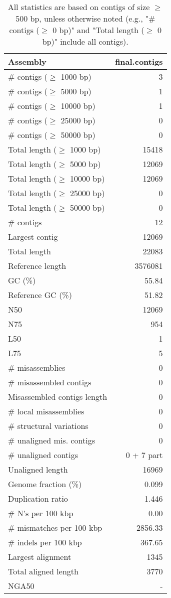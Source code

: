 \documentclass[12pt,a4paper]{article}
\begin{document}
\begin{table}[ht]
\begin{center}
\caption{All statistics are based on contigs of size $\geq$ 500 bp, unless otherwise noted (e.g., "\# contigs ($\geq$ 0 bp)" and "Total length ($\geq$ 0 bp)" include all contigs).}
\begin{tabular}{|l*{1}{|r}|}
\hline
Assembly & final.contigs \\ \hline
\# contigs ($\geq$ 1000 bp) & 3 \\ \hline
\# contigs ($\geq$ 5000 bp) & 1 \\ \hline
\# contigs ($\geq$ 10000 bp) & 1 \\ \hline
\# contigs ($\geq$ 25000 bp) & 0 \\ \hline
\# contigs ($\geq$ 50000 bp) & 0 \\ \hline
Total length ($\geq$ 1000 bp) & 15418 \\ \hline
Total length ($\geq$ 5000 bp) & 12069 \\ \hline
Total length ($\geq$ 10000 bp) & 12069 \\ \hline
Total length ($\geq$ 25000 bp) & 0 \\ \hline
Total length ($\geq$ 50000 bp) & 0 \\ \hline
\# contigs & 12 \\ \hline
Largest contig & 12069 \\ \hline
Total length & 22083 \\ \hline
Reference length & 3576081 \\ \hline
GC (\%) & 55.84 \\ \hline
Reference GC (\%) & 51.82 \\ \hline
N50 & 12069 \\ \hline
N75 & 954 \\ \hline
L50 & 1 \\ \hline
L75 & 5 \\ \hline
\# misassemblies & 0 \\ \hline
\# misassembled contigs & 0 \\ \hline
Misassembled contigs length & 0 \\ \hline
\# local misassemblies & 0 \\ \hline
\# structural variations & 0 \\ \hline
\# unaligned mis. contigs & 0 \\ \hline
\# unaligned contigs & 0 + 7 part \\ \hline
Unaligned length & 16969 \\ \hline
Genome fraction (\%) & 0.099 \\ \hline
Duplication ratio & 1.446 \\ \hline
\# N's per 100 kbp & 0.00 \\ \hline
\# mismatches per 100 kbp & 2856.33 \\ \hline
\# indels per 100 kbp & 367.65 \\ \hline
Largest alignment & 1345 \\ \hline
Total aligned length & 3770 \\ \hline
NGA50 & - \\ \hline
\end{tabular}
\end{center}
\end{table}
\end{document}
